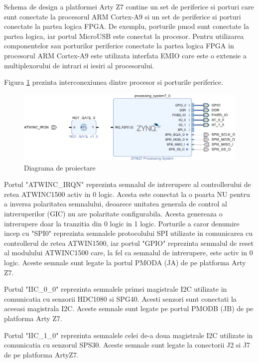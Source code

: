 Schema de design a platformei Arty Z7 contine un set de periferice si porturi care sunt conectate la procesorul ARM Cortex-A9 si un set de periferice si porturi 
conectate la partea logica FPGA. De exemplu, porturile pmod sunt conectate la partea logica, iar portul MicroUSB este conectat la procesor. Pentru utilizarea 
componentelor sau porturilor periferice conectate la partea logica FPGA in procesorul ARM Cortex-A9 este utilizata interfata EMIO care este o extensie a 
multiplexorului de intrari si iesiri al procesorului.

Figura \ref{fig:PI_ZynqBlockDesign} prezinta interconexiunea dintre procesor si porturile periferice.
\begin{figure}[H]
    \centering
    \includegraphics[scale=0.6]{figs/PI_ZynqBlockDesign.png}
    \caption{Diagrama de proiectare}
    \label{fig:PI_ZynqBlockDesign}
\end{figure}

Portul "ATWINC\_IRQN" reprezinta semnalul de intrerupere al controllerului de retea ATWINC1500 activ in 0 logic. Acesta este conectat la o poarta NU pentru a 
inversa polaritatea semnalului, deoarece unitatea generala de control al intreruperilor (GIC) nu are polaritate configurabila. Acesta genereaza o intrerupere 
doar la tranzitia din 0 logic in 1 logic. Porturile a caror denumire incep cu "SPI0" reprezinta semnalele protocolului SPI utilizate in comunicarea cu controllerul 
de retea ATWIN1500, iar portul "GPIO" reprezinta semnalul de reset al modulului ATWINC1500 care, la fel ca semnalul de intrerupere, este activ in 0 logic. Aceste 
semnale sunt legate la portul PMODA (JA) de pe platforma Arty Z7.

Portul "IIC\_0\_0" reprezinta semnalele primei magistrale I2C utilizate in comunicatia cu senzorii HDC1080 si SPG40. Acesti senzori sunt conectati la aceeasi magistrala I2C. 
Aceste semnale sunt legate pe portul PMODB (JB) de pe platforma Arty Z7.

Portul "IIC\_1\_0" reprezinta semnalele celei de-a doua magistrale I2C utilizate in comunicatia cu senzorul SPS30. Aceste semnale sunt legate la conectorii J2 si J7 
de pe platforma ArtyZ7.

